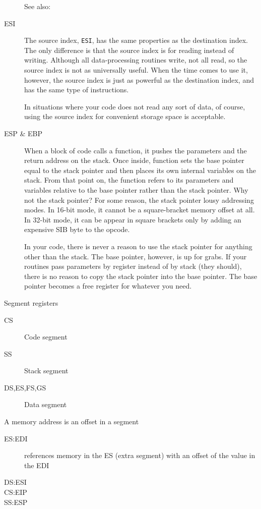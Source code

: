 \begin{description}
  See also: 
\item[ESI] The source index, \texttt{ESI}, has the same properties as the destination
  index. The only difference is that the source index is for reading instead of
  writing. Although all data-processing routines write, not all read, so the source index
  is not as universally useful. When the time comes to use it, however, the source index
  is just as powerful as the destination index, and has the same type of instructions.

  In situations where your code does not read any sort of data, of course, using the
  source index for convenient storage space is acceptable.
\item[ESP \& EBP] When a block of code calls a function, it pushes the
  parameters and the return address on the stack. Once inside, function sets the base
  pointer equal to the stack pointer and then places its own internal variables on the
  stack. From that point on, the function refers to its parameters and variables relative
  to the base pointer rather than the stack pointer. Why not the stack pointer?  For some
  reason, the stack pointer lousy addressing modes. In 16-bit mode, it cannot be a
  square-bracket memory offset at all. In 32-bit mode, it can be appear in square brackets
  only by adding an expensive SIB byte to the opcode.

  In your code, there is never a reason to use the stack pointer for anything other than
  the stack. The base pointer, however, is up for grabs. If your routines pass parameters
  by register instead of by stack (they should), there is no reason to copy the stack
  pointer into the base pointer. The base pointer becomes a free register for whatever you
  need.
\end{description}

\begin{frame}
  \begin{block}{Segment registers}
    \begin{description}
    \item[CS] Code segment
    \item[SS] Stack segment
    \item[DS,ES,FS,GS] Data segment
    \end{description}
  \end{block}
  \begin{block}{A memory address is an offset in a segment}
    \begin{description}
    \item[ES:EDI] references memory in the ES (extra segment) with an offset of the value in the EDI
    \item[DS:ESI]
    \item[CS:EIP]
    \item[SS:ESP] 
    \end{description}
  \end{block}
\end{frame}

